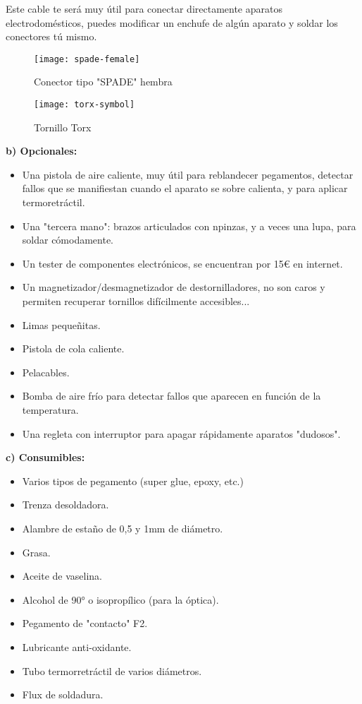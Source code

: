 Este cable te será muy útil para conectar directamente aparatos electrodomésticos, puedes modificar un enchufe de algún aparato y soldar los conectores tú mismo.

\begin{figure}[h]
    \centering
    \begin{minipage}[b]{0.45\textwidth}
        \centering
        \texttt{[image: spade-female]} 
        \caption*{Conector tipo "SPADE" hembra}
    \end{minipage}
    \hfill
    \begin{minipage}[b]{0.45\textwidth}
        \centering
        \texttt{[image: torx-symbol]} 
        \caption*{Tornillo Torx}
    \end{minipage}
\end{figure}

\vspace{1em}
{\large \textbf{b) Opcionales:}}
\begin{itemize}[label=\CheckmarkBold]
\setlength\itemsep{0em} %
\item Una pistola de aire caliente, muy útil para reblandecer pegamentos, detectar fallos que se manifiestan cuando el aparato se sobre calienta, y para aplicar termoretráctil.
\item Una "tercera mano": brazos articulados con npinzas, y a veces una lupa, para soldar cómodamente.
\item Un tester de componentes electrónicos, se encuentran por 15€ en internet.
\item Un magnetizador/desmagnetizador de destornilladores, no son caros y permiten recuperar tornillos difícilmente accesibles...
\item Limas pequeñitas.
\item Pistola de cola caliente.
\item Pelacables.
\item Bomba de aire frío para detectar fallos que aparecen en función de la temperatura.
\item Una regleta con interruptor para apagar rápidamente aparatos "dudosos".
\end{itemize}
\newpage

{\large \textbf{c) Consumibles:}}
\begin{itemize}[label=\CheckmarkBold]
\setlength\itemsep{0em}
\item Varios tipos de pegamento (super glue, epoxy, etc.)
\item Trenza desoldadora.
\item Alambre de estaño de 0,5 y 1mm de diámetro.
\item Grasa.
\item Aceite de vaselina.
\item Alcohol de 90° o isopropílico (para la óptica).
\item Pegamento de "contacto" F2.
\item Lubricante anti-oxidante.
\item Tubo termorretráctil de varios diámetros.
\item Flux de soldadura.
\end{itemize}

